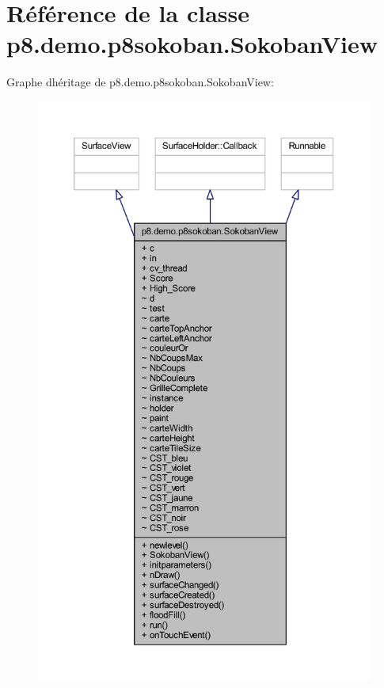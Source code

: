 \hypertarget{classp8_1_1demo_1_1p8sokoban_1_1_sokoban_view}{}\section{Référence de la classe p8.\+demo.\+p8sokoban.\+Sokoban\+View}
\label{classp8_1_1demo_1_1p8sokoban_1_1_sokoban_view}


Graphe d\textquotesingle{}héritage de p8.\+demo.\+p8sokoban.\+Sokoban\+View\+:
\nopagebreak
\begin{figure}[H]
\begin{center}
\leavevmode
\includegraphics[height=550pt]{classp8_1_1demo_1_1p8sokoban_1_1_sokoban_view__inherit__graph}
\end{center}
\end{figure}


